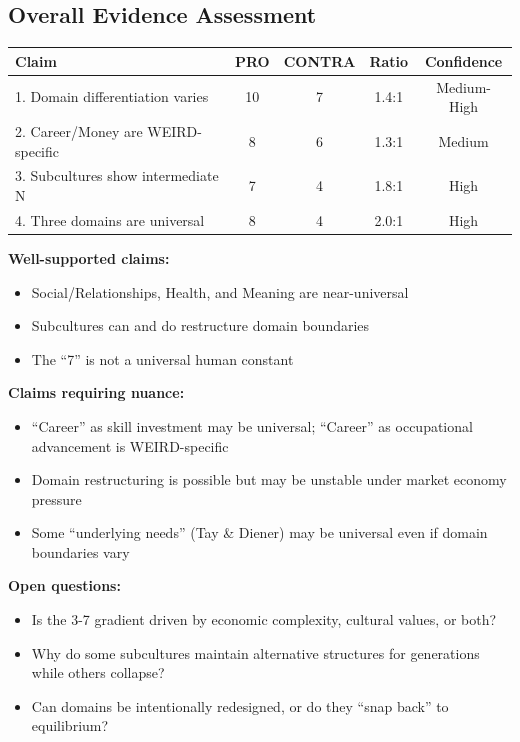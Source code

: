 \subsection{Overall Evidence Assessment}

\begin{center}
\begin{tabular}{@{}lcccc@{}}
\toprule
\textbf{Claim} & \textbf{PRO} & \textbf{CONTRA} & \textbf{Ratio} & \textbf{Confidence} \\
\midrule
1. Domain differentiation varies & 10 & 7 & 1.4:1 & Medium-High \\
2. Career/Money are WEIRD-specific & 8 & 6 & 1.3:1 & Medium \\
3. Subcultures show intermediate N & 7 & 4 & 1.8:1 & High \\
4. Three domains are universal & 8 & 4 & 2.0:1 & High \\
\bottomrule
\end{tabular}
\end{center}

\begin{tcolorbox}[colback=gray!5!white, colframe=gray!75!black, title=Meta-Conclusion: Sections 6-7 Validity]

\textbf{Well-supported claims:}
\begin{itemize}[nosep]
\item Social/Relationships, Health, and Meaning are near-universal
\item Subcultures can and do restructure domain boundaries
\item The ``7'' is not a universal human constant
\end{itemize}

\textbf{Claims requiring nuance:}
\begin{itemize}[nosep]
\item ``Career'' as skill investment may be universal; ``Career'' as occupational advancement is WEIRD-specific
\item Domain restructuring is possible but may be unstable under market economy pressure
\item Some ``underlying needs'' (Tay \& Diener) may be universal even if domain boundaries vary
\end{itemize}

\textbf{Open questions:}
\begin{itemize}[nosep]
\item Is the 3-7 gradient driven by economic complexity, cultural values, or both?
\item Why do some subcultures maintain alternative structures for generations while others collapse?
\item Can domains be intentionally redesigned, or do they ``snap back'' to equilibrium?
\end{itemize}

\end{tcolorbox}

